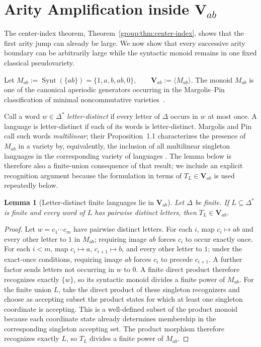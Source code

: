 \documentclass[10pt,a4paper]{article}
\newtheorem{lemma}[theorem]{Lemma}
\theoremstyle{definition}
\theoremstyle{remark}
\begin{document}
\section{Arity Amplification inside \texorpdfstring{\(\mathbf V_{ab}\)}{Vab}}
\label{sec:vab-arity}

The center-index theorem,
Theorem~\ref{group:thm:center-index}, shows that the first arity jump can
already be large.  We now show that every successive arity boundary can be
arbitrarily large while the syntactic monoid remains in one fixed classical
pseudovariety.

Let
\(
M_{ab}:=\operatorname{Synt}(\{ab\})
=\{1,a,b,ab,0\},
\qquad
\mathbf V_{ab}:=\langle M_{ab}\rangle.
\)
The monoid \(M_{ab}\) is one of the canonical aperiodic generators occurring in
the Margolis--Pin classification of minimal noncommutative
varieties~\cite{MargolisPin1984}.

Call a word \(w\in\Delta^*\) \emph{letter-distinct} if every letter of
\(\Delta\) occurs in \(w\) at most once. A language is letter-distinct if
each of its words is letter-distinct.  Margolis and Pin call such words
\emph{multilinear}; their Proposition~1.1 characterizes the presence of
\(M_{ab}\) in a variety by, equivalently, the inclusion of all multilinear
singleton languages in the corresponding variety of languages
\cite[Proposition~1.1]{MargolisPin1984}.  The lemma below is therefore also a
finite-union consequence of that result; we include an explicit recognition
argument because the formulation in terms of \(T_L\in\mathbf V_{ab}\) is used
repeatedly below.

\begin{lemma}[Letter-distinct finite languages lie in \(\mathbf V_{ab}\)]
\label{vab:lem:letterdistinct}
Let \(\Delta\) be finite. If \(L\subseteq\Delta^*\) is finite and every word
of \(L\) has pairwise distinct letters, then \(T_L\in\mathbf V_{ab}.\) \end{lemma}

\begin{proof}
Let \(w=c_1\cdots c_m\) have pairwise distinct letters. For each \(i\), map
\(c_i\mapsto ab\) and every other letter to \(1\) in \(M_{ab}\); requiring image
\(ab\) forces \(c_i\) to occur exactly once. For each \(i<m\), map
\(c_i\mapsto a\), \(c_{i+1}\mapsto b\), and every other letter to \(1\);
under the exact-once conditions, requiring image \(ab\) forces \(c_i\) to
precede \(c_{i+1}\). A further factor sends letters not occurring in \(w\)
to \(0\). A finite direct product therefore recognizes exactly \(\{w\}\),
so its syntactic monoid divides a finite power of \(M_{ab}\). For the finite
union \(L\), take the direct product of these singleton recognizers and
choose as accepting subset the product states for which at least one
singleton coordinate is accepting.  This is a well-defined subset of the
product monoid because each coordinate state already determines membership in
the corresponding singleton accepting set.  The product morphism therefore
recognizes exactly \(L\), so \(T_L\) divides a finite power of \(M_{ab}\).
\end{proof}
\end{document}
